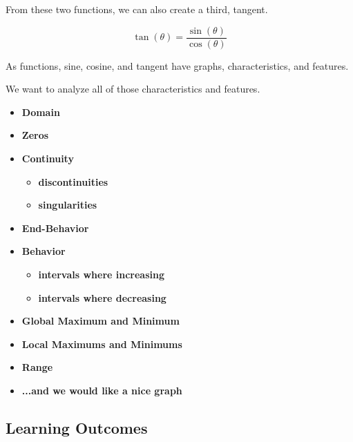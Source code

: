 \documentclass{ximera}
\begin{document}
From these two functions, we can also create a third, tangent.

\[       
\tan(\theta) = \frac{\sin(\theta)}{\cos(\theta)}
\]



As functions, sine, cosine, and tangent have graphs, characteristics, and features.


We want to analyze all of those characteristics and features.



\begin{itemize}
\item \textbf{\textcolor{red!80!black}{Domain}} 
\item \textbf{\textcolor{red!80!black}{Zeros}} 
\item \textbf{\textcolor{red!80!black}{Continuity}} 
  \begin{itemize}
     \item \textbf{\textcolor{purple!85!blue}{discontinuities}} 
     \item \textbf{\textcolor{purple!85!blue}{singularities}} 
  \end{itemize}
\item \textbf{\textcolor{red!80!black}{End-Behavior}} 
\item \textbf{\textcolor{red!80!black}{Behavior}} 
  \begin{itemize}
     \item \textbf{\textcolor{purple!85!blue}{intervals where increasing}} 
     \item \textbf{\textcolor{purple!85!blue}{intervals where decreasing}} 
  \end{itemize}
\item \textbf{\textcolor{red!80!black}{Global Maximum and Minimum}} 
\item \textbf{\textcolor{red!80!black}{Local Maximums and Minimums}} 
\item \textbf{\textcolor{red!80!black}{Range}} 
\item \textbf{\textcolor{blue!55!black}{...and we would like a nice graph}} 
\end{itemize}

















\subsection*{Learning Outcomes}
\end{document}

